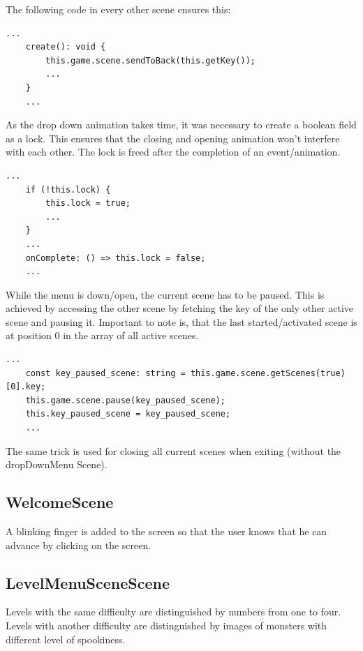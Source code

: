 The following code in every other scene ensures this:
\begin{lstlisting}[style=TypeScript, caption={Send current scene to back}]
    ...
    create(): void {
        this.game.scene.sendToBack(this.getKey());
        ...
    }
    ...
\end{lstlisting}

As the drop down animation takes time, it was necessary to create a boolean field as a lock.
This ensures that the closing and opening animation won't interfere with each other.
The lock is freed after the completion of an event/animation.

\begin{lstlisting}[style=TypeScript, caption={Lock aquiring and freeing}]
    ...
    if (!this.lock) {
        this.lock = true;
        ...
    }
    ...
    onComplete: () => this.lock = false;
    ...
\end{lstlisting}

While the menu is down/open, the current scene has to be paused.
This is achieved by accessing the other scene by fetching the key of the only other active scene and pausing it.
Important to note is, that the last started/activated scene is at position 0 in the array of all active scenes.
\begin{lstlisting}[style=TypeScript, caption={Fetching current active scene}]
    ...
    const key_paused_scene: string = this.game.scene.getScenes(true)[0].key;
    this.game.scene.pause(key_paused_scene);
    this.key_paused_scene = key_paused_scene;
    ...
\end{lstlisting}

The same trick is used for closing all current scenes when exiting (without the dropDownMenu Scene).

\subsection{WelcomeScene}\label{subsec:welcomescene}
A blinking finger is added to the screen so that the user knows that he can advance by clicking on the screen.

\subsection{LevelMenuSceneScene}\label{subsec:levelmenuscenescene}
Levels with the same difficulty are distinguished by numbers from one to four.
Levels with another difficulty are distinguished by images of monsters with different level of spookiness.

